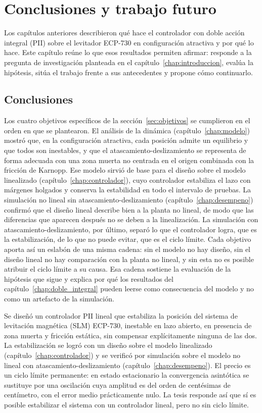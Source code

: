 \chapter{Conclusiones y trabajo futuro}\label{chap:conclusiones}

Los capítulos anteriores describieron qué hace el controlador con doble acción integral (PII) sobre el levitador ECP-730 en configuración atractiva y por qué lo hace. Este capítulo reúne lo que esos resultados permiten afirmar: responde a la pregunta de investigación planteada en el capítulo~\ref{chap:introduccion}, evalúa la hipótesis, sitúa el trabajo frente a sus antecedentes y propone cómo continuarlo.

\section{Conclusiones}\label{sec:conclusiones}

Los cuatro objetivos específicos de la sección~\ref{sec:objetivos} se cumplieron en el orden en que se plantearon. El análisis de la dinámica (capítulo~\ref{chap:modelo}) mostró que, en la configuración atractiva, cada posición admite un equilibrio y que todos son inestables, y que el atascamiento-deslizamiento se representa de forma adecuada con una zona muerta no centrada en el origen combinada con la fricción de Karnopp. Ese modelo sirvió de base para el diseño sobre el modelo linealizado (capítulo~\ref{chap:controlador}), cuyo controlador estabiliza el lazo con márgenes holgados y conserva la estabilidad en todo el intervalo de pruebas. La simulación no lineal sin atascamiento-deslizamiento (capítulo~\ref{chap:desempeno}) confirmó que el diseño lineal describe bien a la planta no lineal, de modo que las diferencias que aparecen después no se deben a la linealización. La simulación con atascamiento-deslizamiento, por último, separó lo que el controlador logra, que es la estabilización, de lo que no puede evitar, que es el ciclo límite. Cada objetivo aporta así un eslabón de una misma cadena: sin el modelo no hay diseño, sin el diseño lineal no hay comparación con la planta no lineal, y sin esta no es posible atribuir el ciclo límite a su causa. Esa cadena sostiene la evaluación de la hipótesis que sigue y explica por qué los resultados del capítulo~\ref{chap:doble_integral} pueden leerse como consecuencia del modelo y no como un artefacto de la simulación.

Se diseñó un controlador PII lineal que estabiliza la posición del sistema de levitación magnética (SLM) ECP-730, inestable en lazo abierto, en presencia de zona muerta y fricción estática, sin compensar explícitamente ninguna de las dos. La estabilización se logró con un diseño sobre el modelo linealizado (capítulo~\ref{chap:controlador}) y se verificó por simulación sobre el modelo no lineal con atascamiento-deslizamiento (capítulo~\ref{chap:desempeno}). El precio es un ciclo límite permanente: en estado estacionario la convergencia asintótica se sustituye por una oscilación cuya amplitud es del orden de centésimas de centímetro, con el error medio prácticamente nulo. La tesis responde así que sí es posible estabilizar el sistema con un controlador lineal, pero no sin ciclo límite.

